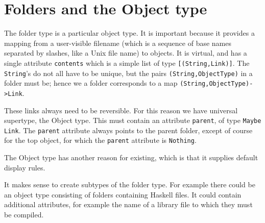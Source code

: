 \documentclass[a4paper]{article}
\begin{document}
\section{Folders and the Object type}
The folder type is a particular object type.  It is important because
it provides a mapping from a user-visible filename (which is a sequence
of base names separated by slashes, like a Unix file name) to objects.  It is
virtual, and has a single attribute \texttt{contents} which is a simple list
of type \texttt{[(String,Link)]}.  The \texttt{String}'s do not all have to
be unique, but the pairs \texttt{(String,ObjectType)} in a folder must be;
hence we a folder corresponds to a map \texttt{(String,ObjectType)->Link}.
\par
These links always need to be reversible.  For this reason we have 
universal supertype, the Object type.  This must contain an attribute
\texttt{parent}, of type \texttt{Maybe Link}.  The \texttt{parent}
attribute always points to the parent folder, except of course for the
top object, for which the \texttt{parent} attribute is \texttt{Nothing}.
\par
The Object type has another reason for existing, which is that it
supplies default display rules.
\par
It makes sense to create subtypes of the folder type.  For example there
could be an object type consisting of folders containing Haskell files.
It could contain additional attributes, for example the name of a library
file to which they must be compiled.
\end{document}
